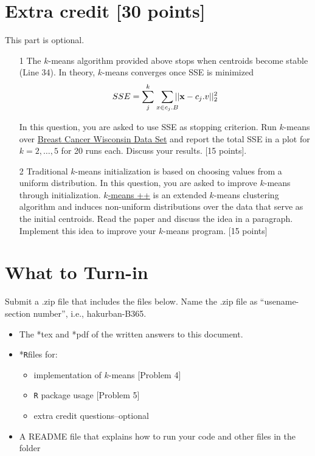 \documentclass{article}
\newcommand{\quotes}[1]{``#1''}
\begin{document}
\section*{Extra credit [30 points]}

This part is optional. 

\begin{enumerate}

\item[1] The $k$-means algorithm provided above stops when centroids become stable (Line  34). In theory, $k$-means converges once SSE is minimized
\begin{eqnarray*}
SSE = \sum_{j}^k \ \ \smashoperator{ \sum_{x \in c_j.B}} ||\mathbf{x} - c_j.v||^2_2 \label{costfunt}
\end{eqnarray*} 

In this question, you are asked to use SSE as stopping criterion. Run $k$-means over  \href{https://archive.ics.uci.edu/ml/datasets/breast+cancer+wisconsin+(original)}{ Breast Cancer Wisconsin Data Set} and report the total SSE  in a plot for $k = 2,\ldots ,5$ for 20 runs each. Discuss your results. [15 points].



\item[2] Traditional $k$-means initialization is based on choosing values from a uniform distribution. In this question, you are asked to improve $k$-means through initialization.  \href{http://ilpubs.stanford.edu:8090/778/1/2006-13.pdf}{$k$-means ++} is an extended $k$-means clustering algorithm and induces non-uniform  distributions over  the data  that serve as  the initial centroids. Read the paper and discuss the idea in a paragraph.  Implement this idea to improve your $k$-means program. [15 points]
\end{enumerate}


\pagebreak
\section*{What to Turn-in}
 Submit a .zip file that includes the files below. Name the .zip  file as \quotes{usename-section number}, i.e., hakurban-B365.





\begin{itemize}
\item The *tex and *pdf of the written answers to this document.
\item *\texttt{R}files for:
\begin{itemize}
\item  implementation of $k$-means  [Problem 4] 
\item \texttt{R}  package  usage [Problem 5]
\item  extra  credit questions--optional
\end{itemize}
\item A README file that explains how to run your code and other files in the folder
\end{itemize}


 
\end{document}
